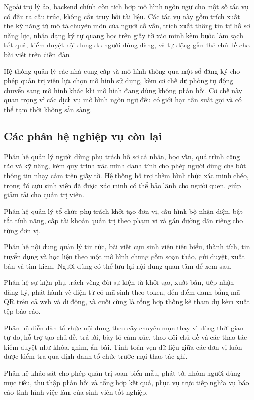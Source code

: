 \documentclass[12pt,a4paper,oneside]{report}
\begin{document}
Ngoài trợ lý ảo, backend chính còn tích hợp mô hình ngôn ngữ cho một số tác vụ có đầu ra cấu trúc, không cần truy hồi tài liệu. Các tác vụ này gồm trích xuất thẻ kỹ năng từ mô tả chuyên môn của người cố vấn, trích xuất thông tin từ hồ sơ năng lực, nhận dạng ký tự quang học trên giấy tờ xác minh kèm bước làm sạch kết quả, kiểm duyệt nội dung do người dùng đăng, và tự động gắn thẻ chủ đề cho bài viết trên diễn đàn.

Hệ thống quản lý các nhà cung cấp và mô hình thông qua một sổ đăng ký cho phép quản trị viên lựa chọn mô hình sử dụng, kèm cơ chế dự phòng tự động chuyển sang mô hình khác khi mô hình đang dùng không phản hồi. Cơ chế này quan trọng vì các dịch vụ mô hình ngôn ngữ đều có giới hạn tần suất gọi và có thể tạm thời không sẵn sàng.

\subsection{Các phân hệ nghiệp vụ còn lại}

Phân hệ quản lý người dùng phụ trách hồ sơ cá nhân, học vấn, quá trình công tác và kỹ năng, kèm quy trình xác minh danh tính cho phép người dùng che bớt thông tin nhạy cảm trên giấy tờ. Hệ thống hỗ trợ thêm hình thức xác minh chéo, trong đó cựu sinh viên đã được xác minh có thể bảo lãnh cho người quen, giúp giảm tải cho quản trị viên.

Phân hệ quản lý tổ chức phụ trách khởi tạo đơn vị, cấu hình bộ nhận diện, bật tắt tính năng, cấp tài khoản quản trị theo phạm vi và gán đường dẫn riêng cho từng đơn vị.

Phân hệ nội dung quản lý tin tức, bài viết cựu sinh viên tiêu biểu, thành tích, tin tuyển dụng và học liệu theo một mô hình chung gồm soạn thảo, gửi duyệt, xuất bản và tìm kiếm. Người dùng có thể lưu lại nội dung quan tâm để xem sau.

Phân hệ sự kiện phụ trách vòng đời sự kiện từ khởi tạo, xuất bản, tiếp nhận đăng ký, phát hành vé điện tử có mã sinh theo token, đến điểm danh bằng mã QR trên cả web và di động, và cuối cùng là tổng hợp thống kê tham dự kèm xuất tệp báo cáo.

Phân hệ diễn đàn tổ chức nội dung theo cây chuyên mục thay vì dòng thời gian tự do, hỗ trợ tạo chủ đề, trả lời, bày tỏ cảm xúc, theo dõi chủ đề và các thao tác kiểm duyệt như khóa, ghim, ẩn bài. Tính toàn vẹn dữ liệu giữa các đơn vị luôn được kiểm tra qua định danh tổ chức trước mọi thao tác ghi.

Phân hệ khảo sát cho phép quản trị soạn biểu mẫu, phát tới nhóm người dùng mục tiêu, thu thập phản hồi và tổng hợp kết quả, phục vụ trực tiếp nghĩa vụ báo cáo tình hình việc làm của sinh viên tốt nghiệp.
\end{document}
